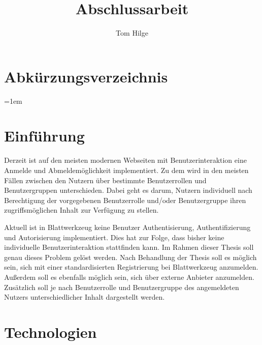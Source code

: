 \documentclass[11pt]{article}
\title{Abschlussarbeit}
\author{Tom Hilge}
\begin{document}
	
	\section{Abkürzungsverzeichnis}
	\label{sec: abbreviations}
	
	\begin{acronym}[Bash]
		\leftskip=1em
	\end{acronym}
	
	\section{Einführung}
	\label{sec:introduction}
	
	\begin{flushleft}
		Derzeit ist auf den meisten modernen Webseiten mit Benutzerinteraktion eine Anmelde und Abmeldemöglichkeit implementiert. Zu dem wird in den meisten Fällen zwischen den Nutzern über bestimmte Benutzerrollen und Benutzergruppen unterschieden. Dabei geht es darum, Nutzern individuell nach Berechtigung der vorgegebenen Benutzerrolle und/oder Benutzergruppe ihren zugriffsmöglichen Inhalt zur Verfügung zu stellen.\par\bigskip
		
		Aktuell ist in Blattwerkzeug keine Benutzer Authentisierung, Authentifizierung und Autorisierung implementiert. Dies hat zur Folge, dass bisher keine individuelle Benutzerinteraktion stattfinden kann. Im Rahmen dieser Thesis soll genau dieses Problem gelöst werden. Nach Behandlung der Thesis soll es möglich sein, sich mit einer standardisierten Registrierung bei Blattwerkzeug anzumelden. Außerdem soll es ebenfalls möglich sein, sich über externe Anbieter anzumelden. Zusätzlich soll je nach Benutzerrolle und Benutzergruppe des angemeldeten Nutzers unterschiedlicher Inhalt dargestellt werden.
	\end{flushleft}


	\section{Technologien}
	\label{sec:technology}
	
\end{document}

